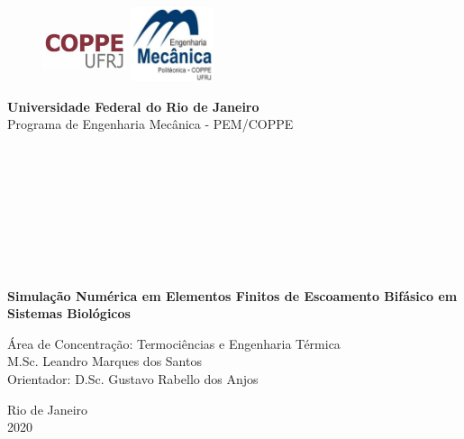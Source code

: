 \begin{titlepage}
\begin{center}


  \begin{figure}[hbt!]
		          \includegraphics[width=2.44cm,height=1.8cm]{figure/coppe.png}
		   \hfill \includegraphics[width=2.44cm,height=2.17cm]{figure/pem.png}
  \end{figure}



  \vspace{-2cm}
  \hspace{0cm}\large{\textbf{Universidade Federal do Rio de Janeiro}}\\
  \hspace{0cm}\large{Programa de Engenharia Mecânica - PEM/COPPE}\\

  \hspace{2cm}\large{}\\
  \hspace{2cm}\large{}\\
  \hspace{2cm}\large{}\\
  \hspace{2cm}\large{}\\

  \hspace{2cm}\large{}\\
  \hspace{2cm}\large{}\\
  \hspace{2cm}\large{}\\
  \hspace{2cm}\large{}\\


  \par
  \vspace{1cm}
  \textbf{\LARGE \justifying Simulação Numérica em Elementos Finitos de Escoamento Bifásico em Sistemas Biológicos }

  \par
  \vspace{0.5cm}
  {Área de Concentração: Termociências e Engenharia Térmica}\\
  \vspace{0.5cm}
  {M.Sc. Leandro Marques dos Santos}\\
  \vspace{0.3cm}
  {Orientador: D.Sc. Gustavo Rabello dos Anjos}



  \par\vfill
  {\large Rio de Janeiro\\2020}

\end{center}
\end{titlepage}
